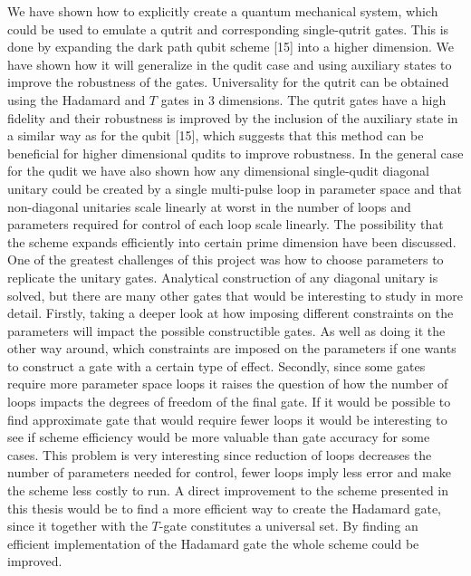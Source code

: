 We have shown how to explicitly create a quantum mechanical system, which could be used to emulate a qutrit and corresponding single-qutrit gates. This is done by expanding the dark path qubit scheme [15] into a higher dimension. We have shown how it will generalize in the qudit case and using auxiliary states to improve the robustness of the gates. Universality for the qutrit can be obtained using the Hadamard and $T$ gates in 3 dimensions. The qutrit gates have a high fidelity and their robustness is improved by the inclusion of the auxiliary state in a similar way as for the qubit [15], which suggests that this method can be beneficial for higher dimensional qudits to improve robustness. In the general case for the qudit we have also shown how any dimensional single-qudit diagonal unitary could be created by a single multi-pulse loop in parameter space and that non-diagonal unitaries scale linearly at worst in the number of loops and parameters required for control of each loop scale linearly. The possibility that the scheme expands efficiently into certain prime dimension have been discussed.
\\

\noindent One of the greatest challenges of this project was how to choose parameters to replicate the unitary gates. Analytical construction of any diagonal unitary is solved, but there are many other gates that would be interesting to study in more detail. Firstly, taking a deeper look at how imposing different constraints on the parameters will impact the possible constructible gates. As well as doing it the other way around, which constraints are imposed on the parameters if one wants to construct a gate with a certain type of effect. Secondly, since some gates require more parameter space loops it raises the question of how the number of loops impacts the degrees of freedom of the final gate. If it would be possible to find approximate gate that would require fewer loops it would be  interesting to see if scheme efficiency would be more valuable than gate accuracy for some cases. This problem is very interesting since reduction of loops decreases the number of parameters needed for control, fewer loops imply less error and make the scheme less costly to run. A direct improvement to the scheme presented in this thesis would be to find a more efficient way to create the Hadamard gate, since it together with the $T$-gate constitutes a universal set. By finding an efficient implementation of the Hadamard gate the whole scheme could be improved. 

